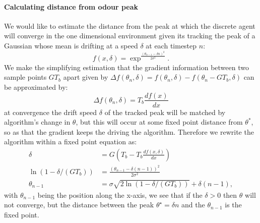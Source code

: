 \documentclass[10pt,a4paper]{article}
\begin{document}
\paragraph{Calculating distance from odour peak}
We would like to estimate the distance from the peak at which the discrete agent will converge in the one dimensional environment given its tracking the peak of a Gaussian whose mean is drifting at a speed $\delta$ at each timestep $n$:
\begin{equation}
f(x,\delta) = \exp^{\frac{(\theta_{n-1}-\delta n)^2}{2 \sigma^2}}.
\end{equation}
We make the simplifying estimation that the gradient information between two sample points $G T_b$ apart given by ${\Delta f(\theta_{n},\delta)} = f(\theta_{n},\delta) - f(\theta_{n}-G T_b,\delta) $ can be approximated by:
\begin{equation}
\Delta f(\theta_{n},\delta) = T_b\frac{df(x)}{dx} 
\end{equation}
at convergence the drift speed $\delta$ of the tracked peak will be matched by algorithm's change in $\theta$, but this will occur at some fixed point distance from $\theta^*$, so as that the gradient keeps the driving the algorithm. Therefore we rewrite the algorithm within a fixed point equation as:
\begin{align}
\delta &= G (T_b - T_b\frac{df(x,\delta)}{dx})\\
\ln(1-\delta/(G T_b)) &= \frac{(\theta_{n-1}-\delta (n-1))^2}{2 \sigma^2}\\
\theta_{n-1} &= \sigma \sqrt{2 \ln(1-\delta/(G T_b))} + \delta (n-1),
\end{align} 
with $\theta_{n-1} $ being the position along the x-axis, we see that if the $\delta > 0$ then $\theta$ will not converge, but the distance between the peak $\theta^{\star}=\delta n$ and the $\theta_{n-1}$ is the fixed point.
\end{document}
